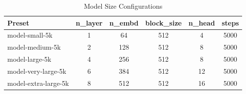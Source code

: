 
\begin{table}[H]
\centering
\begin{tabular}{lccccc}
\hline
\textbf{Preset} & \textbf{n\_layer} & \textbf{n\_embd} & \textbf{block\_size} & \textbf{n\_head} & \textbf{steps} \\
\hline
model-small-5k        & 1 & 64  & 512 & 4  & 5000 \\
model-medium-5k       & 2 & 128 & 512 & 8  & 5000 \\
model-large-5k        & 4 & 256 & 512 & 8  & 5000 \\
model-very-large-5k   & 6 & 384 & 512 & 12 & 5000 \\
model-extra-large-5k  & 8 & 512 & 512 & 16 & 5000 \\
\hline
\end{tabular}
\caption{Model Size Configurations}
\end{table}

